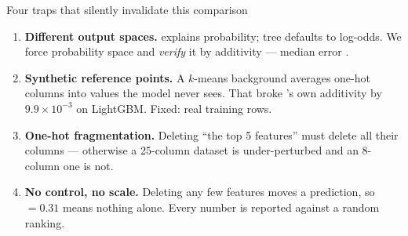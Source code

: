 \begin{frame}{Four traps that silently invalidate this comparison}
\small
\begin{enumerate}\setlength\itemsep{0.55em}
  \item \textbf{Different output spaces.} \lime{} explains probability; tree \shap{}
    defaults to log-odds. We force probability space and \emph{verify} it by additivity
    --- median error \AdditivityMedianMax{}.
  \item \textbf{Synthetic reference points.} A $k$-means background averages one-hot
    columns into values the model never sees. That broke \shap{}'s own additivity by
    $9.9\times10^{-3}$ on LightGBM. Fixed: real training rows.
  \item \textbf{One-hot fragmentation.} Deleting ``the top 5 features'' must delete all
    their columns --- otherwise a 25-column dataset is under-perturbed and an 8-column
    one is not.
  \item \textbf{No control, no scale.} Deleting any few features moves a prediction, so
    \aopc{} $=0.31$ means nothing alone. Every number is reported against a random
    ranking.
\end{enumerate}
\end{frame}
